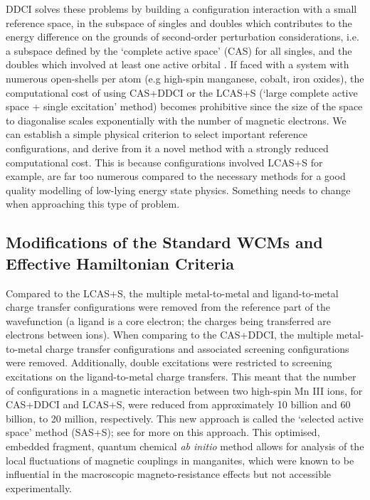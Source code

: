 \documentclass[10pt]{article}
\begin{document}
DDCI solves these problems by building a configuration interaction with a small reference space, in the subspace of singles and doubles which contributes to the energy difference on the grounds of second-order perturbation considerations, i.e. a subspace defined by the `complete active space' (CAS) for all singles, and the doubles which involved at least one active orbital \cite{garcia1997application}. If faced with a system with numerous open-shells per atom (e.g high-spin manganese, cobalt, iron oxides), the computational cost of using CAS+DDCI or the LCAS+S (`large complete active space + single excitation' method) becomes prohibitive since the size of the space to diagonalise scales exponentially with the number of magnetic electrons. We can establish a simple physical criterion to select important reference configurations, and derive from it a novel method with a strongly reduced computational cost. This is because configurations involved LCAS+S for example, are far too numerous compared to the necessary methods for a good quality modelling of low-lying energy state physics. Something needs to change when approaching this type of problem.

\subsection{Modifications of the Standard WCMs and Effective Hamiltonian Criteria}

Compared to the LCAS+S, the multiple metal-to-metal and ligand-to-metal charge transfer configurations were removed from the reference part of the wavefunction (a ligand is a core electron; the charges being transferred are electrons between ions). When comparing to the CAS+DDCI, the multiple metal-to-metal charge transfer configurations and associated screening configurations were removed. Additionally, double excitations were restricted to screening excitations on the ligand-to-metal charge transfers. This meant that the number of configurations in a magnetic interaction between two high-spin Mn III ions, for CAS+DDCI and LCAS+S, were reduced from approximately 10 billion and 60 billion, to 20 million, respectively. This new approach is called the `selected active space' method (SAS+S); see \cite{gelle2009accurate} for more on this approach. This optimised, embedded fragment, quantum chemical {\it ab initio} method allows for analysis of the local fluctuations of magnetic couplings in manganites, which were known to be influential in the macroscopic magneto-resistance effects but not accessible experimentally.
\end{document}
